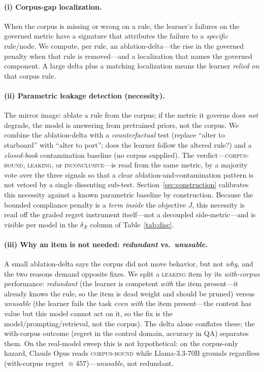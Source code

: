 \documentclass{article}
\newcommand{\regret}{\mathcal{R}}
\begin{document}
\paragraph{(i) Corpus-gap localization.} When the corpus is missing or wrong on a rule, the
learner's failures on the governed metric have a signature that attributes the failure to a
\emph{specific} rule/node. We compute, per rule, an ablation-delta---the rise in the
governed penalty when that rule is removed---and a localization that names the governed
component. A large delta plus a matching localization means the learner \emph{relied on}
that corpus rule.

\paragraph{(ii) Parametric leakage detection (necessity).} The mirror image: ablate a rule from the
corpus; if the metric it governs does \emph{not} degrade, the model is answering from
pretrained priors, not the corpus. We combine the ablation-delta with a
\emph{counterfactual} test (replace ``alter to starboard'' with ``alter to port''; does the
learner follow the altered rule?) and a \emph{closed-book} contamination baseline (no
corpus supplied). The verdict---\textsc{corpus-bound}, \textsc{leaking}, or
\textsc{inconclusive}---is read from the same metric, by a majority vote over the three
signals so that a clear ablation-and-contamination pattern is not vetoed by a single
dissenting sub-test. Section~\ref{sec:construction} calibrates this necessity against a known
parametric baseline by construction. Because the bounded compliance penalty is a \emph{term inside}
the objective $J$, this necessity is read off the graded regret instrument itself---not a decoupled
side-metric---and is visible per model in the $\delta_{\!\regret}$ column of Table~\ref{tab:disc}.

\paragraph{(iii) Why an item is not needed: \emph{redundant} vs.\ \emph{unusable}.} A small
ablation-delta says the corpus did not move behavior, but not \emph{why}, and the two reasons
demand opposite fixes. We split a \textsc{leaking} item by its \emph{with-corpus} performance:
\emph{redundant} (the learner is competent \emph{with} the item present---it already knows the
rule, so the item is dead weight and should be pruned) versus \emph{unusable} (the learner fails
the task \emph{even with} the item present---the content has value but this model cannot act on
it, so the fix is the model/prompting/retrieval, not the corpus). The delta alone conflates
these; the with-corpus outcome (regret in the control domain, accuracy in QA) separates them. On
the real-model sweep this is not hypothetical: on the corpus-only hazard, Claude Opus reads
\textsc{corpus-bound} while Llama-3.3-70B grounds regardless (with-corpus regret
$\approx\!457$)---\emph{unusable}, not redundant.
\end{document}
